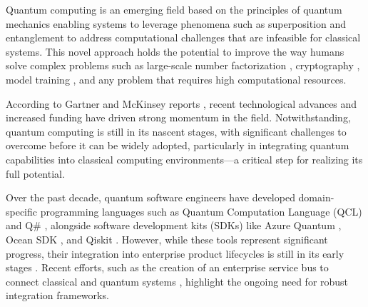 Quantum computing is an emerging field based on the principles of quantum mechanics \cite{Maslov2019} enabling systems to leverage phenomena such as superposition and entanglement to address computational challenges that are infeasible for classical systems. This novel approach holds the potential to improve the way humans solve complex problems such as large-scale number factorization \cite{Willsch2023}, cryptography \cite{Upadhyay2019}, model training \cite{Biamonte2017, AdvancesinQuantumDeepLearning}, and any problem that requires high computational resources. %

According to Gartner and McKinsey reports \cite{McKinsey}, recent technological advances and increased funding have driven strong momentum in the field. Notwithstanding, quantum computing is still in its nascent stages, with significant challenges to overcome before it can be widely adopted, particularly in integrating quantum capabilities into classical computing environments—a critical step for realizing its full potential. %

Over the past decade, quantum software engineers have developed domain-specific programming languages such as Quantum Computation Language (QCL) \cite{6} and Q\# \cite{7}, alongside software development kits (SDKs) like Azure Quantum \cite{8}, Ocean SDK \cite{9}, and Qiskit \cite{10}. However, while these tools represent significant progress, their integration into enterprise product lifecycles is still in its early stages \cite{Ruefenacht2022}. Recent efforts, such as the creation of an enterprise service bus to connect classical and quantum systems \cite{Bonilla2024}, highlight the ongoing need for robust integration frameworks.


